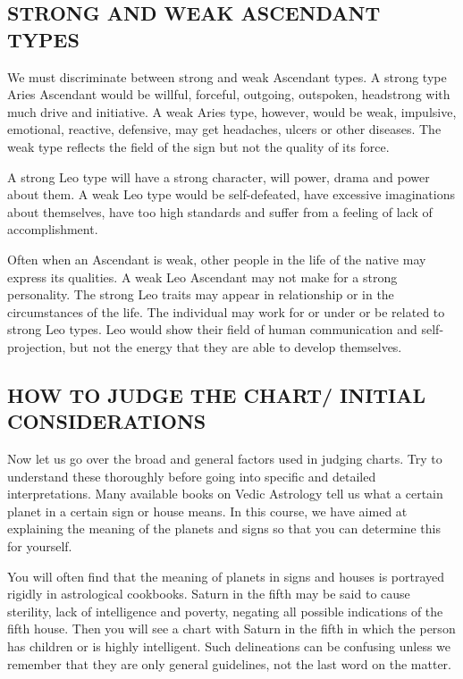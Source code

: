  

 
 

\subsection{STRONG AND WEAK ASCENDANT TYPES}

 

We must discriminate between strong and weak Ascendant types. A strong type Aries Ascendant would be willful, forceful, outgoing, outspoken, headstrong with much drive and initiative. A weak Aries type, however, would be weak, impulsive, emotional, reactive, defensive, may get headaches, ulcers or other diseases. The weak type reflects the field of the sign but not the quality of its force.

 

A strong Leo type will have a strong character, will power, drama and power about them. A weak Leo type would be self-defeated, have excessive imaginations about themselves, have too high standards and suffer from a feeling of lack of accomplishment.

 

Often when an Ascendant is weak, other people in the life of the native may express its qualities. A weak Leo Ascendant may not make for a strong personality. The strong Leo traits may appear in relationship or in the circumstances of the life. The individual may work for or under or be related to strong Leo types. Leo would show their field of human communication and self-projection, but not the energy that they are able to develop themselves.

 

\subsection{HOW TO JUDGE THE CHART/ INITIAL CONSIDERATIONS}
 

Now let us go over the broad and general factors used in judging charts. Try to understand these thoroughly before going into specific and detailed interpretations. Many available books on Vedic Astrology tell us what a certain planet in a certain sign or house means. In this course, we have aimed at explaining the meaning of the planets and signs so that you can determine this for yourself.

 

You will often find that the meaning of planets in signs and houses is portrayed rigidly in astrological cookbooks. Saturn in the fifth may be said to cause sterility, lack of intelligence and poverty, negating all possible indications of the fifth house. Then you will see a chart with Saturn in the fifth in which the person has children or is highly intelligent. Such delineations can be confusing unless we remember that they are only general guidelines, not the last word on the matter.

